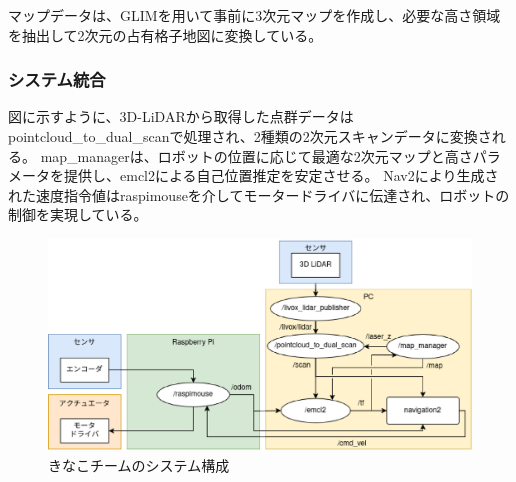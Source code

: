 マップデータは、GLIMを用いて事前に3次元マップを作成し、必要な高さ領域を抽出して2次元の占有格子地図に変換している。


\subsubsection{システム統合}
図に示すように、3D-LiDARから取得した点群データはpointcloud\_to\_dual\_scanで処理され、2種類の2次元スキャンデータに変換される。
map\_managerは、ロボットの位置に応じて最適な2次元マップと高さパラメータを提供し、emcl2による自己位置推定を安定させる。
Nav2により生成された速度指令値はraspimouseを介してモータードライバに伝達され、ロボットの制御を実現している。

\begin{figure}[h]
  \begin{center}
    \includegraphics[width=1.0\linewidth]{figs/kinako_system.eps}
    \caption{きなこチームのシステム構成}
    \label{fig:mugimaru_system}
  \end{center}
\end{figure}
